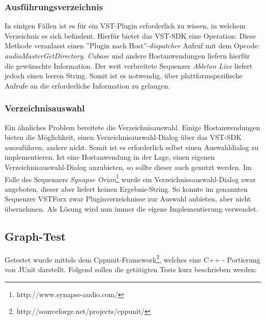 \subsubsection{Ausführungsverzeichnis}
In einigen Fällen ist es für ein VST-Plugin erforderlich zu wissen, in welchem Verzeichnis es sich befindent.
Hierfür bietet das VST-SDK eine Operation:  Diese Methode veranlasst einen ''Plugin nach Host''-\emph{dispatcher} Aufruf mit dem Opcode: \emph{audioMasterGetDirectory}.
\emph{Cubase} und andere Hostanwendungen liefern hierfür die gewünschte Information. Der weit verbreitete Sequenzer \emph{Ableton Live} liefert jedoch einen leeren String. Somit ist es notwendig, über plattformspezifische Aufrufe an die erforderliche Information zu gelangen.

\subsubsection{Verzeichnisauswahl}
Ein ähnliches Problem bereitete die Verzeichnisauswahl. Einige Hostanwendungen bieten die Möglichkeit, einen Verzeichnisauswahl-Dialog über das VST-SDK auszuführen, andere nicht. Somit ist es erforderlich selbst einen Auswahldialog zu implementieren. Ist eine Hostanwendung in der Lage, einen eigenen Verzeichnisauswahl-Dialog anzubieten, so sollte dieser auch genutzt werden. Im Falle des Sequenzers \emph{Synapse Orion}\footnote{http://www.synapse-audio.com/} wurde ein Verzeichnissauswahl-Dialog zwar angeboten, dieser aber liefert keinen Ergebnis-String. So konnte im genannten Sequenzer VSTForx zwar Pluginverzeichnisse zur Auswahl anbieten, aber nicht übernehmen. Als Lösung wird nun immer die eigene Implementierung verwendet.
\subsection{Graph-Test}
Getestet wurde mittels dem Cppunit-Framework\footnote{http://sourceforge.net/projects/cppunit/}, welches eine C++ - Portierung von JUnit darstellt. Folgend sollen die getätigten Tests kurz beschrieben werden:

